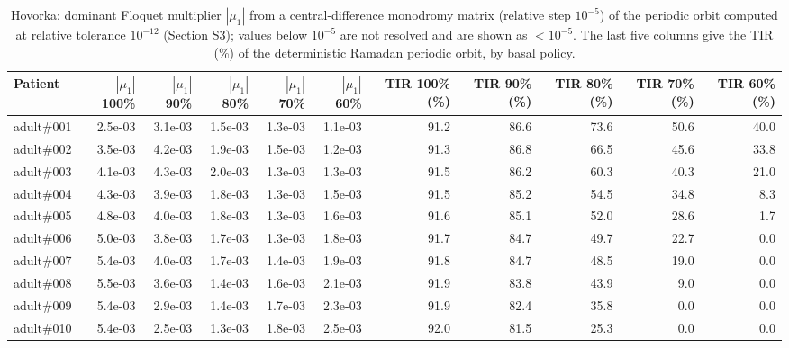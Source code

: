 \begin{table}[H]
\centering
\caption{Hovorka: dominant Floquet multiplier $|\mu_1|$ from a central-difference monodromy matrix (relative step $10^{-5}$) of the periodic orbit computed at relative tolerance $10^{-12}$ (Section S3); values below $10^{-5}$ are not resolved and are shown as $<10^{-5}$. The last five columns give the TIR (\%) of the deterministic Ramadan periodic orbit, by basal policy.}\label{tab:S3a}
\scriptsize
\begin{tabular}{lrrrrrrrrrr}
\toprule
Patient & $|\mu_1|$ 100\% & $|\mu_1|$ 90\% & $|\mu_1|$ 80\% & $|\mu_1|$ 70\% & $|\mu_1|$ 60\% & TIR 100\% (\%) & TIR 90\% (\%) & TIR 80\% (\%) & TIR 70\% (\%) & TIR 60\% (\%) \\
\midrule
adult\#001 & 2.5e-03 & 3.1e-03 & 1.5e-03 & 1.3e-03 & 1.1e-03 & 91.2 & 86.6 & 73.6 & 50.6 & 40.0 \\
adult\#002 & 3.5e-03 & 4.2e-03 & 1.9e-03 & 1.5e-03 & 1.2e-03 & 91.3 & 86.8 & 66.5 & 45.6 & 33.8 \\
adult\#003 & 4.1e-03 & 4.3e-03 & 2.0e-03 & 1.3e-03 & 1.3e-03 & 91.5 & 86.2 & 60.3 & 40.3 & 21.0 \\
adult\#004 & 4.3e-03 & 3.9e-03 & 1.8e-03 & 1.3e-03 & 1.5e-03 & 91.5 & 85.2 & 54.5 & 34.8 & 8.3 \\
adult\#005 & 4.8e-03 & 4.0e-03 & 1.8e-03 & 1.3e-03 & 1.6e-03 & 91.6 & 85.1 & 52.0 & 28.6 & 1.7 \\
adult\#006 & 5.0e-03 & 3.8e-03 & 1.7e-03 & 1.3e-03 & 1.8e-03 & 91.7 & 84.7 & 49.7 & 22.7 & 0.0 \\
adult\#007 & 5.4e-03 & 4.0e-03 & 1.7e-03 & 1.4e-03 & 1.9e-03 & 91.8 & 84.7 & 48.5 & 19.0 & 0.0 \\
adult\#008 & 5.5e-03 & 3.6e-03 & 1.4e-03 & 1.6e-03 & 2.1e-03 & 91.9 & 83.8 & 43.9 & 9.0 & 0.0 \\
adult\#009 & 5.4e-03 & 2.9e-03 & 1.4e-03 & 1.7e-03 & 2.3e-03 & 91.9 & 82.4 & 35.8 & 0.0 & 0.0 \\
adult\#010 & 5.4e-03 & 2.5e-03 & 1.3e-03 & 1.8e-03 & 2.5e-03 & 92.0 & 81.5 & 25.3 & 0.0 & 0.0 \\
\bottomrule
\end{tabular}
\end{table}

